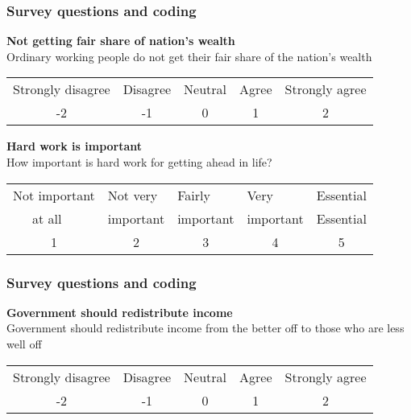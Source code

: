 \documentclass{beamer}              %
\begin{document}
\begin{frame}\label{Questions}

\frametitle{Survey questions and coding}
\linespread{1.2}
\textbf{Not getting fair share of nation's wealth} \\
\hspace{1cm}Ordinary working people do not get their fair share of the nation's wealth
\\
\vspace{0.3cm}
\begin{tabular}{lllll} 
\hline
Strongly disagree & Disagree & Neutral & Agree & Strongly agree \\
\multicolumn{1}{c}{-2} & \multicolumn{1}{c}{-1} & \multicolumn{1}{c}{0} & \multicolumn{1}{c}{1} & \multicolumn{1}{c}{2} \\
\hline
\end{tabular}

\vspace{1.3cm}
\textbf{Hard work is important} \\
\hspace{1cm}How important is hard work for getting ahead in life?
\\
\vspace{0.3cm}
\begin{tabular}{lllll} 

\hline
 Not important & Not very  & Fairly  & Very  & Essential \\
~~~at all & important & important & important & Essential \\
\multicolumn{1}{c}{1} & \multicolumn{1}{c}{2} & \multicolumn{1}{c}{3} & \multicolumn{1}{c}{4} & \multicolumn{1}{c}{5} \\
\hline
\end{tabular}


\end{frame}




\begin{frame}\label{Questions}

\frametitle{Survey questions and coding}
\linespread{1.2}
\textbf{Government should redistribute income} \\
\hspace{1cm}Government should redistribute income from the better off to those who are less well off
\\
\vspace{0.3cm}
\begin{tabular}{lllll} 
\hline
Strongly disagree & Disagree & Neutral & Agree & Strongly agree \\
\multicolumn{1}{c}{-2} & \multicolumn{1}{c}{-1} & \multicolumn{1}{c}{0} & \multicolumn{1}{c}{1} & \multicolumn{1}{c}{2} \\
\hline
\end{tabular}




\end{frame}
\end{document}
